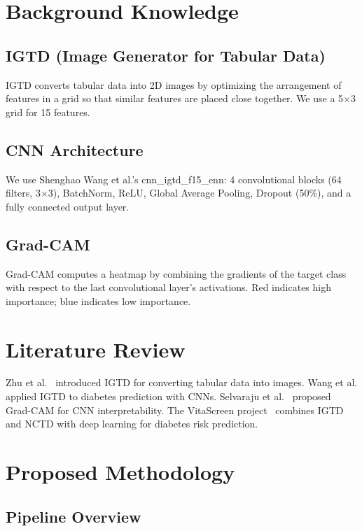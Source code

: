 \documentclass[12pt]{dalthesis}
\begin{document}
\chapter{Background Knowledge}\label{ch:background}

\section{IGTD (Image Generator for Tabular Data)}

IGTD converts tabular data into 2D images by optimizing the arrangement of features in a grid so that similar features are placed close together. We use a 5$\times$3 grid for 15 features.

\section{CNN Architecture}

We use Shenghao Wang et al.'s cnn\_igtd\_f15\_enn: 4 convolutional blocks (64 filters, 3$\times$3), BatchNorm, ReLU, Global Average Pooling, Dropout (50\%), and a fully connected output layer.

\section{Grad-CAM}

Grad-CAM computes a heatmap by combining the gradients of the target class with respect to the last convolutional layer's activations. Red indicates high importance; blue indicates low importance.

\chapter{Literature Review}\label{ch:lit}

Zhu et al.~\cite{zhu2021igtd} introduced IGTD for converting tabular data into images. Wang et al. applied IGTD to diabetes prediction with CNNs. Selvaraju et al.~\cite{selvaraju2017gradcam} proposed Grad-CAM for CNN interpretability. The VitaScreen project~\cite{vitascreen} combines IGTD and NCTD with deep learning for diabetes risk prediction.

\chapter{Proposed Methodology}\label{ch:method}

\section{Pipeline Overview}
\end{document}
